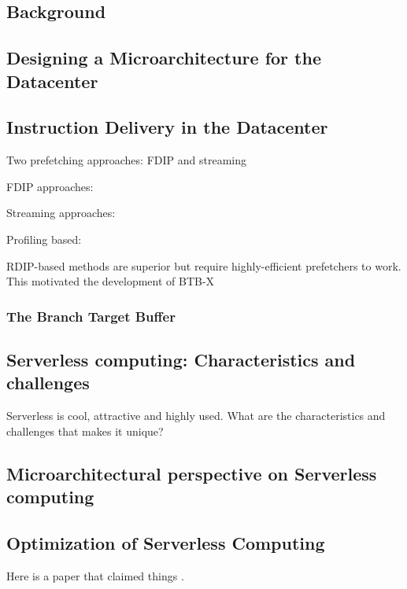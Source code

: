 \documentclass[../main.tex]{subfiles}
\begin{document}
\ifx\chapincluded\undefined
  \begin{refsection}
 \fi


\chapter{Background}

\section{Designing a Microarchitecture for the Datacenter}
\cite{kanev15_profil,ferdman12_clear_cloud}


\section{Instruction Delivery in the Datacenter}


Two prefetching approaches: FDIP and streaming


FDIP approaches: \cite{reinman99_fetch_direc_instr_prefet, kumar17_boomer,kumar18_blast_throug_front_end_bottl_with_shotg,kumar20_shoot_down_server_front_end_bottl}

Streaming approaches:
\cite{ferdman08_tempor,ferdman11_proac_instr_fetch,kaynak13_shift,kaynak15_confl}

Profiling based:


RDIP-based methods are superior but require highly-efficient prefetchers to work. This motivated the development of BTB-X

\subsection{The Branch Target Buffer}




\section{Serverless computing: Characteristics and challenges}
Serverless is cool, attractive and highly used. What are the characteristics and challenges that makes it unique?


\section{Microarchitectural perspective on Serverless computing}



\section{Optimization of Serverless Computing}


Here is a paper that claimed things \cite{kanev15_profil}.



\ifx\chapincluded\undefined
  \printbibliography
  \end{refsection}
 \fi
\end{document}
